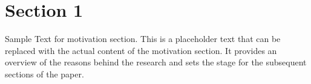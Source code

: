 \section{Section 1}

Sample Text for motivation section. This is a placeholder text that can be replaced with the actual content of the motivation section. It provides an overview of the reasons behind the research and sets the stage for the subsequent sections of the paper.